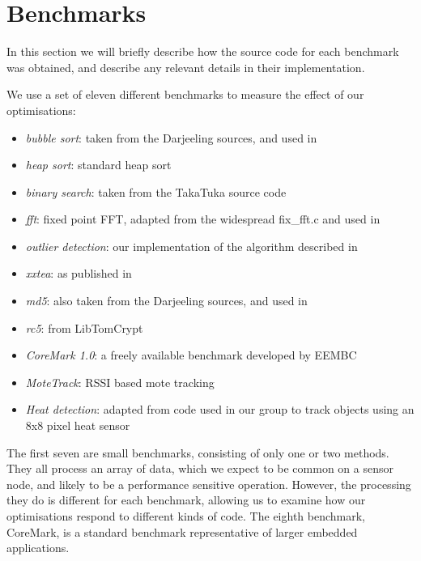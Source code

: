 \section{Benchmarks}
In this section we will briefly describe how the source code for each benchmark was obtained, and describe any relevant details in their implementation.



We use a set of eleven different benchmarks to measure the effect of our optimisations:

\begin{itemize}
\item \emph{bubble sort}: taken from the Darjeeling sources, and used in \cite{Brouwers:2009cj, Ellul:2012thesis}
\item \emph{heap sort}: standard heap sort \cite{heapsort}
\item \emph{binary search}: taken from the TakaTuka \cite{Aslam:2008} source code
\item \emph{fft}: fixed point FFT, adapted from the widespread fix\_fft.c and used in \cite{Kumar:2007ge}
\item \emph{outlier detection}: our implementation of the algorithm described in \cite{Kumar:2007ge}
\item \emph{xxtea}: as published in \cite{Wheeler:1998}
\item \emph{md5}: also taken from the Darjeeling sources, and used in \cite{Brouwers:2009cj, Ellul:2012thesis}
\item \emph{rc5}: from LibTomCrypt \cite{libtomcrypt}
\item \emph{CoreMark 1.0}: a freely available benchmark developed by EEMBC \cite{coremark}
\item \emph{MoteTrack}: RSSI based mote tracking \cite{motetrack, Lorincz:2006fc}
\item \emph{Heat detection}: adapted from code used in our group to track objects using an 8x8 pixel heat sensor
\end{itemize}

The first seven are small benchmarks, consisting of only one or two methods. They all process an array of data, which we expect to be common on a sensor node, and likely to be a performance sensitive operation. However, the processing they do is different for each benchmark, allowing us to examine how our optimisations respond to different kinds of code. The eighth benchmark, CoreMark, is a standard benchmark representative of larger embedded applications.


